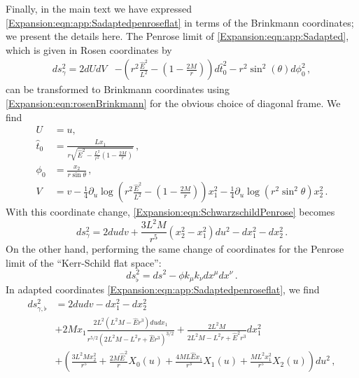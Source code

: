 	Finally, in the main text we have expressed \eqref{Expansion:eqn:app:Sadaptedpenroseflat} in terms of the Brinkmann coordinates; we present the details here. The Penrose limit of \eqref{Expansion:eqn:app:Sadapted}, which is given in Rosen coordinates by
	\begin{equation}\label{Expansion:eqn:SchwarzschildPenrose}
	\begin{aligned}
	ds^2_{\gamma} =  
	2 dU dV&- \left(r^2 \frac{\hat{E}^2}{L^2}-\left(1-\frac{2M}{r}\right)\right)d\hat{t}_0^2 - r^2 \sin^2(\theta) d \phi_0^2   \, ,
	\end{aligned}
	\end{equation}
	can be transformed to Brinkmann coordinates using \eqref{Expansion:eqn:rosenBrinkmann} for the obvious choice of diagonal frame. We find 
	\begin{equation}\label{Expansion:eqn:app:rosenBrinkmann}
	\begin{aligned}
	U &= u  , \\
	\hat{t}_0 &= \frac{L x_1}{r \sqrt{ \hat{E}^2-\frac{L^2}{r^2}(1-\frac{2M}{r})}}  \, ,\\
	\phi_0 &= \frac{x_2}{r \sin \theta} \, , \\
	V &= v - \frac{1}{4}\partial_u \log\left(r^2 \frac{\hat{E}^2}{L^2}-\left(1-\frac{2M}{r}\right)\right) x_1^2 - \frac{1}{4}\partial_u \log\left(r^2 \sin^2\theta\right)x_2^2 \, . 
	\end{aligned}
	\end{equation}
	With this coordinate change, \eqref{Expansion:eqn:SchwarzschildPenrose} becomes 
	\begin{equation}\label{Expansion:eqn:brinkmann}
	ds^2_{\gamma} = 2 du dv + \frac{3 L^2 M}{r^5}\left(x_2^2-x_1^2\right)du^2 - dx_1^2-dx_2^2 \, .
	\end{equation}
	On the other hand, performing the same change of coordinates for the Penrose limit of the ``Kerr-Schild flat space'':
	\begin{equation}
	ds^2_{\flat} = ds^2 - \phi k_{\mu} k_{\nu}dx^{\mu}dx^{\nu} \, .
	\end{equation}
	In adapted coordinates \eqref{Expansion:eqn:app:Sadaptedpenroseflat}, we find
	\begin{equation}\label{Expansion:eqn:app:Sadaptedpenroseflatbrinkmann}
	\begin{aligned}
	ds^2_{\gamma,\flat} &=  
	2 du dv -dx^2_1 - dx_2^2\, \\
	&+ 2 M x_1  \frac{2 L^2 (L^2 M - \hat{E}r^3) du dx_1}{r^{5/2} \left(2 L^2 M -L^2 r + \hat{E} r^3 \right)^{3/2}}  + \frac{2L^2 M}{2 L^2 M -L^2 r + \hat{E}^2 r^3} dx_1^2 \\
	&+ \left( \frac{3 L^2 M x_2^2}{r^5} + \frac{2M \hat{E}^2}{r} X_0(u) + \frac{4 M L \hat{E} x_1}{r^3} X_1(u) + \frac{M L^2 x_1^2}{r^5} X_2(u) \right)du^2 \, ,
	\end{aligned}
	\end{equation}
